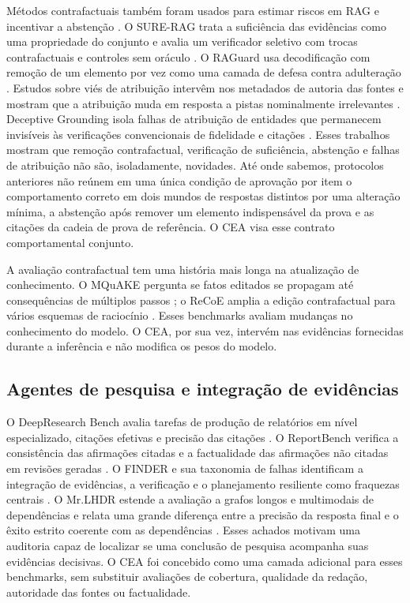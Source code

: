 \documentclass[10pt,twocolumn]{article}
\newcommand{\method}{\textsc{CEA}}
\begin{document}
Métodos contrafactuais também foram usados para estimar riscos em RAG e incentivar a abstenção \citep{chen2024risk}. O SURE-RAG trata a suficiência das evidências como uma propriedade do conjunto e avalia um verificador seletivo com trocas contrafactuais e controles sem oráculo \citep{qiu2026surerag}. O RAGuard usa decodificação com remoção de um elemento por vez como uma camada de defesa contra adulteração \citep{kumar2026raguard}. Estudos sobre viés de atribuição intervêm nos metadados de autoria das fontes e mostram que a atribuição muda em resposta a pistas nominalmente irrelevantes \citep{abolghasemi2024bias}. Deceptive Grounding isola falhas de atribuição de entidades que permanecem invisíveis às verificações convencionais de fidelidade e citações \citep{caruzzo2026deceptive}. Esses trabalhos mostram que remoção contrafactual, verificação de suficiência, abstenção e falhas de atribuição não são, isoladamente, novidades. Até onde sabemos, protocolos anteriores não reúnem em uma única condição de aprovação por item o comportamento correto em dois mundos de respostas distintos por uma alteração mínima, a abstenção após remover um elemento indispensável da prova e as citações da cadeia de prova de referência. O \method{} visa esse contrato comportamental conjunto.

A avaliação contrafactual tem uma história mais longa na atualização de conhecimento. O MQuAKE pergunta se fatos editados se propagam até consequências de múltiplos passos \citep{zhong2023mquake}; o ReCoE amplia a edição contrafactual para vários esquemas de raciocínio \citep{hua2024recoe}. Esses benchmarks avaliam mudanças no conhecimento do modelo. O \method{}, por sua vez, intervém nas evidências fornecidas durante a inferência e não modifica os pesos do modelo.

\subsection{Agentes de pesquisa e integração de evidências}

O DeepResearch Bench avalia tarefas de produção de relatórios em nível especializado, citações efetivas e precisão das citações \citep{du2025deepresearch}. O ReportBench verifica a consistência das afirmações citadas e a factualidade das afirmações não citadas em revisões geradas \citep{li2025reportbench}. O FINDER e sua taxonomia de falhas identificam a integração de evidências, a verificação e o planejamento resiliente como fraquezas centrais \citep{zhang2025finder}. O Mr.LHDR estende a avaliação a grafos longos e multimodais de dependências e relata uma grande diferença entre a precisão da resposta final e o êxito estrito coerente com as dependências \citep{guo2026mrlhdr}. Esses achados motivam uma auditoria capaz de localizar se uma conclusão de pesquisa acompanha suas evidências decisivas. O \method{} foi concebido como uma camada adicional para esses benchmarks, sem substituir avaliações de cobertura, qualidade da redação, autoridade das fontes ou factualidade.
\end{document}
